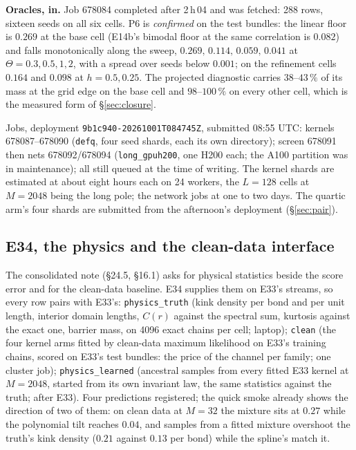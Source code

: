 \documentclass[10pt,a4paper]{article}
\newcommand{\Th}{\Theta}
\newcommand{\code}[1]{\texttt{\small #1}}
\newcommand{\st}[1]{\textbf{#1}}
\theoremstyle{plain}
\theoremstyle{remark}
\begin{document}
\st{Oracles, in.} Job 678084 completed after 2\,h\,04 and was fetched: 288 rows, sixteen seeds on all
six cells. P6 is \emph{confirmed} on the test bundles: the linear floor is $0.269$ at the base cell
(E14b's bimodal floor at the same correlation is $0.082$) and falls monotonically along the sweep,
$0.269,\,0.114,\,0.059,\,0.041$ at $\Th=0.3,0.5,1,2$, with a spread over seeds below $0.001$; on the
refinement cells $0.164$ and $0.098$ at $h=0.5,0.25$. The projected diagnostic carries $38$--$43\,\%$
of its mass at the grid edge on the base cell and $98$--$100\,\%$ on every other cell, which is the
measured form of \S\ref{sec:closure}.

Jobs, deployment \code{9b1c940-20261001T084745Z}, submitted 08:55 UTC: kernels 678087--678090
(\code{defq}, four seed shards, each its own directory); screen 678091 then nets 678092/678094
(\code{long\_gpuh200}, one H200 each; the A100 partition was in maintenance); all still queued at the
time of writing. The kernel shards are estimated at about eight hours each on 24 workers, the
$L=128$ cells at $M=2048$ being the long pole; the network jobs at one to two days. The quartic arm's
four shards are submitted from the afternoon's deployment (\S\ref{sec:pair}).

\subsection{E34, the physics and the clean-data interface}

The consolidated note (\S24.5, \S16.1) asks for physical statistics beside the score error and for
the clean-data baseline. E34 supplies them on E33's streams, so every row pairs with E33's:
\code{physics\_truth} (kink density per bond and per unit length, interior domain lengths, $C(r)$
against the spectral sum, kurtosis against the exact one, barrier mass, on 4096 exact chains per
cell; laptop); \code{clean} (the four kernel arms fitted by clean-data maximum likelihood on E33's
training chains, scored on E33's test bundles: the price of the channel per family; one cluster
job); \code{physics\_learned} (ancestral samples from every fitted E33 kernel at $M=2048$, started
from its own invariant law, the same statistics against the truth; after E33). Four predictions
registered; the quick smoke already shows the direction of two of them: on clean data at $M=32$ the
mixture sits at $0.27$ while the polynomial tilt reaches $0.04$, and samples from a fitted mixture
overshoot the truth's kink density ($0.21$ against $0.13$ per bond) while the spline's match it.
\end{document}
